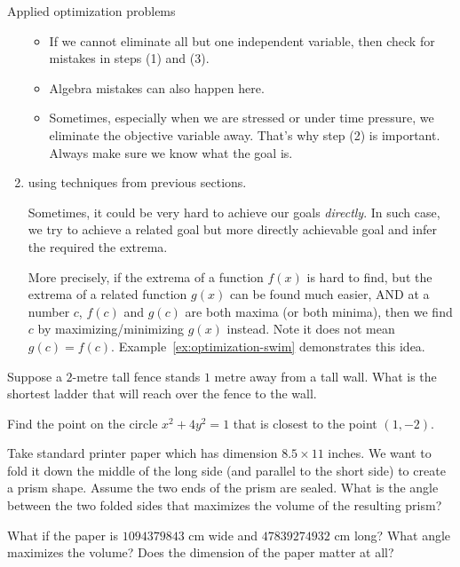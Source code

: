 \documentclass[../main.tex]{subfiles}
\begin{document}
\begin{lesson}{Applied optimization problems}
\begin{enumerate}[label=(\arabic*)]
      \begin{itemize}
        \item If we cannot eliminate all but one independent variable, then check for mistakes in steps (1) and (3).
        \item Algebra mistakes can also happen here.
        \item Sometimes, especially when we are stressed or under time pressure, we eliminate the objective variable away. That's why step (2) is important. Always make sure we know what the goal is.
      \end{itemize}

    \item {} using techniques from previous sections.

      Sometimes, it could be very hard to achieve our goals \emph{directly}. In such case, we try to achieve a related goal but more directly achievable goal and infer the required the extrema. 

      More precisely, if the extrema of a function \(f(x)\) is hard to find, but the extrema of a related function \(g(x)\) can be found much easier, AND at a number \(c\), \(f(c)\) and \(g(c)\) are both maxima (or both minima), then we find \(c\) by maximizing/minimizing \(g(x)\) instead. Note it does not mean \(g(c) = f(c)\).
      Example~\ref{ex:optimization-swim} demonstrates this idea.
  \end{enumerate}
  \clearpage

  \begin{example} \label{ex:optimization-ladder}
    Suppose a \(2\)-metre tall fence stands \(1\) metre away from a tall wall.  What is the shortest ladder that will reach over the fence to the wall.
  \end{example}

  \begin{example}
    Find the point on the circle \(x^{2} + 4y^{2} = 1\) that is closest to the point \((1,-2)\).
  \end{example}

  \begin{example}
    Take standard printer paper which has dimension \(8.5 \times 11\) inches. We want to fold it down the middle of the long side (and parallel to the short side) to create a prism shape. Assume the two ends of the prism are sealed. What is the angle between the two folded sides that maximizes the volume of the resulting prism?


    \faComment{} What if the paper is \(1094379843\) cm wide and \(47839274932\) cm long? What angle maximizes the volume? Does the dimension of the paper matter at all?
  \end{example}
\end{lesson}
\end{document}
